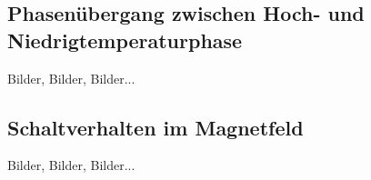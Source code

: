 \subsection{Phasenübergang zwischen Hoch- und Niedrigtemperaturphase}

Bilder, Bilder, Bilder...

\subsection{Schaltverhalten im Magnetfeld}

Bilder, Bilder, Bilder...
